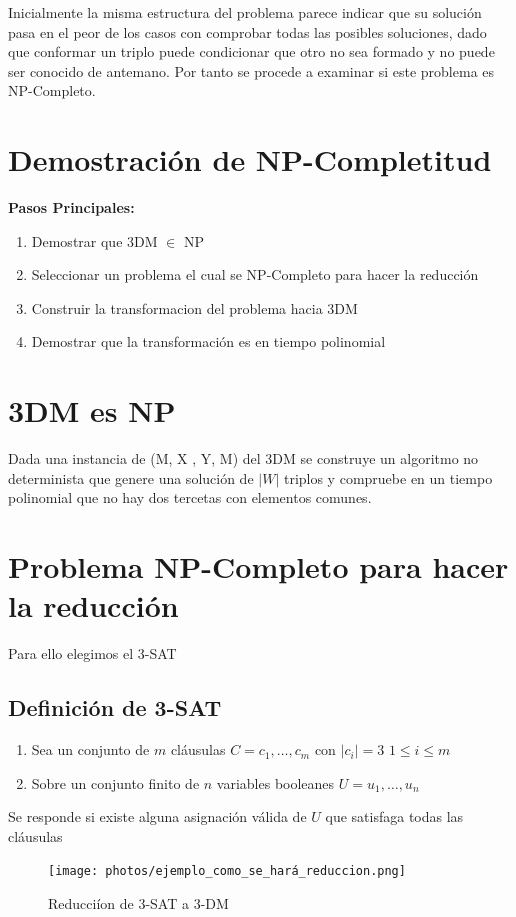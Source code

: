 \documentclass{article}
\begin{document}
Inicialmente la misma estructura del problema parece indicar que su solución pasa en el peor de los casos con comprobar todas las
posibles soluciones, dado que conformar un triplo puede condicionar que otro no sea formado y no puede ser conocido de antemano. 
Por tanto se procede a examinar si este problema es NP-Completo.
\section{Demostración de NP-Completitud}
\textbf{Pasos Principales:}
\begin{enumerate}
    \item Demostrar que 3DM $\in$ NP
    \item Seleccionar un problema el cual se NP-Completo para hacer la reducción
    \item Construir la transformacion del problema hacia 3DM
    \item Demostrar que la transformación es en tiempo polinomial
\end{enumerate}
\newpage

\section{3DM es NP}
Dada una instancia de (M, X , Y, M) del 3DM se construye un algoritmo no determinista que genere una solución de 
$|W|$ triplos y compruebe en un  tiempo polinomial que no hay dos tercetas con elementos comunes.

\section{Problema NP-Completo para hacer la reducción}
Para ello elegimos el 3-SAT
\subsection{Definición de 3-SAT}
\begin{enumerate}
    \item Sea un conjunto de $m$ cláusulas $C={c_1, \dots , c_m}$ con $|c_i|=3$ $1 \leq i \leq m$
    \item Sobre un conjunto finito de $n$ variables booleanes $U={u_1, \dots, u_n}$
    
\end{enumerate}
Se responde si existe alguna asignación válida de $U$ que satisfaga todas las cláusulas

\begin{figure}[H]
    \centering
    \texttt{[image: photos/ejemplo\_como\_se\_hará\_reduccion.png]}
    \caption{Reducciíon de 3-SAT a 3-DM}
    \label{fig:etiqueta}
\end{figure}
\end{document}
